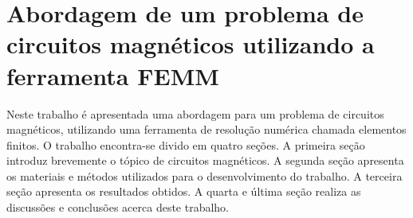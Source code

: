 \chapter{Abordagem de um problema de circuitos magnéticos utilizando a ferramenta FEMM}
\label{chap1}
Neste trabalho é apresentada uma abordagem para um problema de circuitos magnéticos, utilizando uma ferramenta de resolução numérica chamada elementos finitos. O trabalho encontra-se divido em quatro seções. A primeira seção introduz brevemente o tópico de circuitos magnéticos. A segunda seção apresenta os materiais e métodos utilizados para o desenvolvimento do trabalho. A terceira seção apresenta os resultados obtidos. A quarta e última seção realiza as discussões e conclusões acerca deste trabalho.
\newpage
\pagebreak

\newpage
\pagebreak

\newpage
\pagebreak

\newpage
\pagebreak

